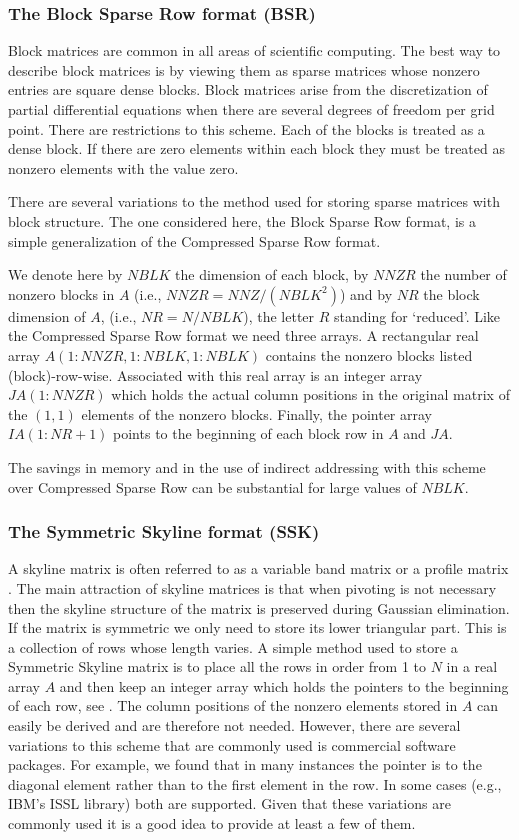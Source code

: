 \subsubsection{The Block Sparse Row format (BSR)} 
Block matrices are common in all areas of scientific computing. The
best way to describe block matrices is by viewing them as sparse
matrices whose nonzero entries are square dense blocks. Block matrices
arise from the discretization of partial differential equations when
there are several degrees of freedom per grid point.  There are
restrictions to this scheme. Each of the blocks is treated as a dense
block. If there are zero elements within each block they must be
treated as nonzero elements with the value zero.

There are several variations to the method used for storing sparse
matrices with block structure. The one considered here, the Block
Sparse Row format, is a simple generalization of the Compressed Sparse
Row format.

We denote here by $NBLK$ the dimension of each block, by 
$NNZR$ the number of nonzero blocks in $A$ (i.e., 
$NNZR = NNZ/(NBLK^2) $) and by $NR$ the block dimension of $A$,
(i.e., $NR = N/NBLK$), the letter $R$ standing for `reduced'. 
Like the Compressed Sparse Row  format we need three arrays. A rectangular
real array $A(1:NNZR,1:NBLK,1:NBLK) $ contains the nonzero
blocks listed (block)-row-wise. Associated with this real array
is an integer array 
$JA(1:NNZR) $ which holds the actual column positions in the 
original matrix of the $(1,1)$ elements of the nonzero blocks.
Finally, the pointer array $IA(1:NR+1)$ points to the beginning
of each block row in $A$ and $JA$. 

The savings in memory and in the use of indirect addressing with  this
scheme over Compressed Sparse Row   can be substantial for large
values of $NBLK$.

\subsubsection{The Symmetric Skyline format (SSK) }
A skyline matrix is often referred to as a variable band
matrix or a profile matrix \cite{Duff-book}.  The main 
attraction of skyline matrices is that when pivoting is
not necessary then the skyline structure of the matrix is preserved 
during Gaussian elimination. If the matrix is symmetric
we only need to store its lower triangular part. This is a
collection of rows whose length varies. A simple method used to store
a Symmetric Skyline matrix is to place all the rows in order from
1 to $N$ in a  real array $A$ and then keep an integer array which holds 
the pointers to the beginning of each row, see \cite{Duff-survey}.
The column positions of the nonzero elements stored in $A$
can easily be derived and are therefore not needed. However, there 
are several variations to this scheme that are commonly used is
commercial software packages. For example, we found that in many 
instances the pointer is to the diagonal element rather than to the 
first element in the row. In some cases (e.g., IBM's ISSL library)
both are supported. Given that these variations are commonly used 
it is a good idea to provide at least a few of them. 

